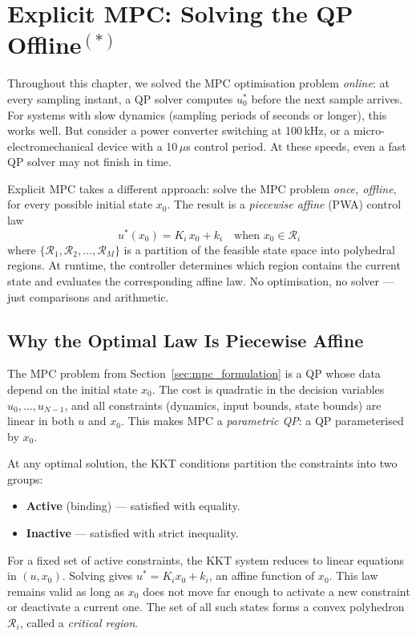 \section{Explicit MPC: Solving the QP Offline\texorpdfstring{$^{(*)}$}{(*)}}
\label{sec:explicit_mpc}

Throughout this chapter, we solved the MPC optimisation problem \emph{online}: at every sampling instant, a QP solver computes $u_0^*$ before the next sample arrives. For systems with slow dynamics (sampling periods of seconds or longer), this works well. But consider a power converter switching at 100\,kHz, or a micro-electromechanical device with a 10\,$\mu$s control period. At these speeds, even a fast QP solver may not finish in time.

Explicit MPC takes a different approach: solve the MPC problem \emph{once, offline}, for every possible initial state $x_0$. The result is a \emph{piecewise affine} (PWA) control law
\[
u^*(x_0) = K_i\, x_0 + k_i \quad \text{when } x_0 \in \mathcal{R}_i
\]
where $\{\mathcal{R}_1, \mathcal{R}_2, \dots, \mathcal{R}_M\}$ is a partition of the feasible state space into polyhedral regions. At runtime, the controller determines which region contains the current state and evaluates the corresponding affine law. No optimisation, no solver --- just comparisons and arithmetic.

\subsection{Why the Optimal Law Is Piecewise Affine}

The MPC problem from Section~\ref{sec:mpc_formulation} is a QP whose data depend on the initial state $x_0$. The cost is quadratic in the decision variables $u_0, \dots, u_{N-1}$, and all constraints (dynamics, input bounds, state bounds) are linear in both $u$ and $x_0$. This makes MPC a \emph{parametric QP}: a QP parameterised by $x_0$.

At any optimal solution, the KKT conditions partition the constraints into two groups:
\begin{itemize}[nosep]
	\item \textbf{Active} (binding) --- satisfied with equality.
	\item \textbf{Inactive} --- satisfied with strict inequality.
\end{itemize}
For a fixed set of active constraints, the KKT system reduces to linear equations in $(u, x_0)$. Solving gives $u^* = K_i x_0 + k_i$, an affine function of $x_0$. This law remains valid as long as $x_0$ does not move far enough to activate a new constraint or deactivate a current one. The set of all such states forms a convex polyhedron $\mathcal{R}_i$, called a \textit{critical region}.

